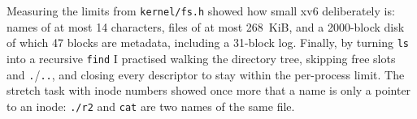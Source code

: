 \documentclass[12pt,a4paper]{article}
\begin{document}
Measuring the limits from \texttt{kernel/fs.h} showed how small xv6 deliberately is: names of at most 14 characters, files of at most 268~KiB, and a 2000-block disk of which 47 blocks are metadata, including a 31-block log. Finally, by turning \texttt{ls} into a recursive \texttt{find} I practised walking the directory tree, skipping free slots and \texttt{.}/\texttt{..}, and closing every descriptor to stay within the per-process limit. The stretch task with inode numbers showed once more that a name is only a pointer to an inode: \texttt{./r2} and \texttt{cat} are two names of the same file.
\end{document}
